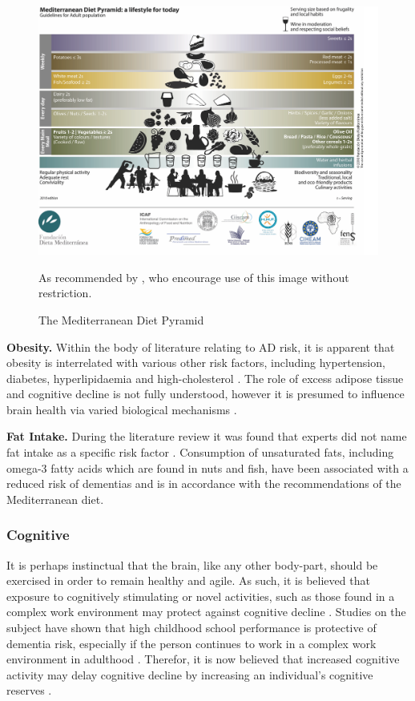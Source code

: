 \begin{figure}[h]
    \centering
    \includegraphics[scale=0.13, angle=0]{Files/prevention-study-1/figures/md-pyramid}
    \caption{The Mediterranean Diet Pyramid}
    \medskip
	\small
	As recommended by \cite{Bach-Faig2011}, who encourage use of this image without restriction.
    \label{fig: med-diet-pyramid}
\end{figure}

\textbf{Obesity.}
Within the body of literature relating to AD risk, it is apparent that obesity is interrelated with various other risk factors, including hypertension, diabetes, hyperlipidaemia and high-cholesterol \cite{Gustafson2012, Gustafson2008}. The role of excess adipose tissue and cognitive decline is not fully understood, however it is presumed to influence brain health via varied biological mechanisms \cite{Gustafson2012}.

\textbf{Fat Intake.}
During the literature review it was found that experts did not name fat intake as a specific risk factor \cite{Deckers2015}. Consumption of unsaturated fats, including omega-3 fatty acids which are found in nuts and fish, have been associated with a reduced risk of dementias \cite{Sydenham2012,Huhn2015} and is in accordance with the recommendations of the Mediterranean diet.

\subsubsection{Cognitive}
It is perhaps instinctual that the brain, like any other body-part, should be exercised in order to remain healthy and agile. As such, it is believed that exposure to cognitively stimulating or novel activities, such as those found in a complex work environment may protect against cognitive decline \cite{Roberts2014}. Studies on the subject have shown that high childhood school performance is protective of dementia risk, especially if the person continues to work in a complex work environment in adulthood \cite{Dekhtyar2015}. Therefor, it is now believed that increased cognitive activity may delay cognitive decline by increasing an individual’s cognitive reserves \cite{Sattler2012, Dekhtyar2015}.


